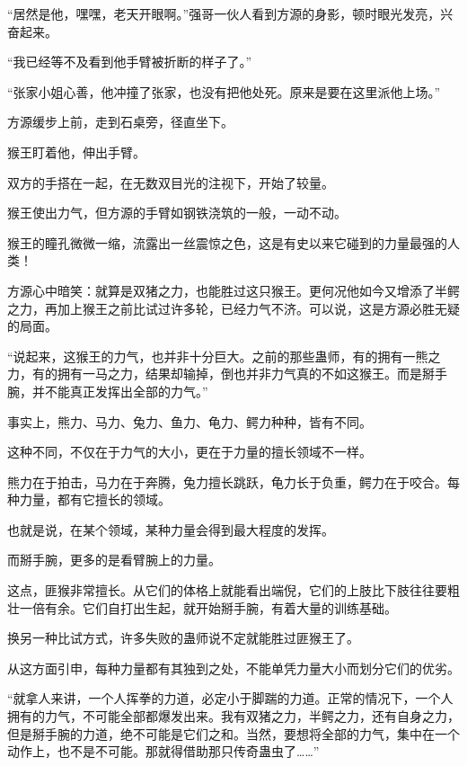 
\begin{this_body}

“居然是他，嘿嘿，老天开眼啊。”强哥一伙人看到方源的身影，顿时眼光发亮，兴奋起来。

“我已经等不及看到他手臂被折断的样子了。”

“张家小姐心善，他冲撞了张家，也没有把他处死。原来是要在这里派他上场。”

方源缓步上前，走到石桌旁，径直坐下。

猴王盯着他，伸出手臂。

双方的手搭在一起，在无数双目光的注视下，开始了较量。

猴王使出力气，但方源的手臂如钢铁浇筑的一般，一动不动。

猴王的瞳孔微微一缩，流露出一丝震惊之色，这是有史以来它碰到的力量最强的人类！

方源心中暗笑：就算是双猪之力，也能胜过这只猴王。更何况他如今又增添了半鳄之力，再加上猴王之前比试过许多轮，已经力气不济。可以说，这是方源必胜无疑的局面。

“说起来，这猴王的力气，也并非十分巨大。之前的那些蛊师，有的拥有一熊之力，有的拥有一马之力，结果却输掉，倒也并非力气真的不如这猴王。而是掰手腕，并不能真正发挥出全部的力气。”

事实上，熊力、马力、兔力、鱼力、龟力、鳄力种种，皆有不同。

这种不同，不仅在于力气的大小，更在于力量的擅长领域不一样。

熊力在于拍击，马力在于奔腾，兔力擅长跳跃，龟力长于负重，鳄力在于咬合。每种力量，都有它擅长的领域。

也就是说，在某个领域，某种力量会得到最大程度的发挥。

而掰手腕，更多的是看臂腕上的力量。

这点，匪猴非常擅长。从它们的体格上就能看出端倪，它们的上肢比下肢往往要粗壮一倍有余。它们自打出生起，就开始掰手腕，有着大量的训练基础。

换另一种比试方式，许多失败的蛊师说不定就能胜过匪猴王了。

从这方面引申，每种力量都有其独到之处，不能单凭力量大小而划分它们的优劣。

“就拿人来讲，一个人挥拳的力道，必定小于脚踹的力道。正常的情况下，一个人拥有的力气，不可能全部都爆发出来。我有双猪之力，半鳄之力，还有自身之力，但是掰手腕的力道，绝不可能是它们之和。当然，要想将全部的力气，集中在一个动作上，也不是不可能。那就得借助那只传奇蛊虫了……”


\end{this_body}
